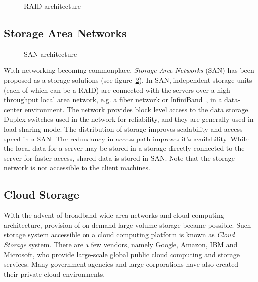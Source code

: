\begin{figure}[htbp!]
	\centerline{
	}
	\caption{RAID architecture}
	\label{fig:bigdata:raid}
\end{figure}


\subsection{Storage Area Networks}

\begin{figure}[htbp!]
	\centerline{
	}
	\caption{SAN architecture}
	\label{fig:bigdata:san}
\end{figure}

With networking becoming commonplace, {\em Storage Area Networks} (SAN) has been proposed as a storage solutions 
(see figure~\ref{fig:bigdata:san}). In SAN, independent
storage units (each of which can be a RAID) are connected with the servers over a high throughput local area network, e.g. a fiber 
network or InfiniBand~\citep{Shanley:2003}, in a data-center environment. The network provides block level access to the data storage.
Duplex switches used in the network for reliability, and they are generally used in load-sharing mode. The distribution of storage
improves scalability and access speed in a SAN. The redundancy in access path improves it's availability. While the local data for a 
server may be stored in a storage directly connected to the server for faster access, shared data is stored in SAN. Note that the 
storage network is not accessible to the client machines.
 
\subsection{Cloud Storage}

With the advent of broadband wide area networks and cloud computing architecture, provision of on-demand large volume storage
became possible. Such storage system accessible on a cloud computing platform is known as {\em Cloud Storage} system. There
are a few vendors, namely Google, Amazon, IBM and Microsoft, who provide large-scale global public cloud computing and storage 
services. Many government agencies and large corporations have also created their private cloud environments. 

